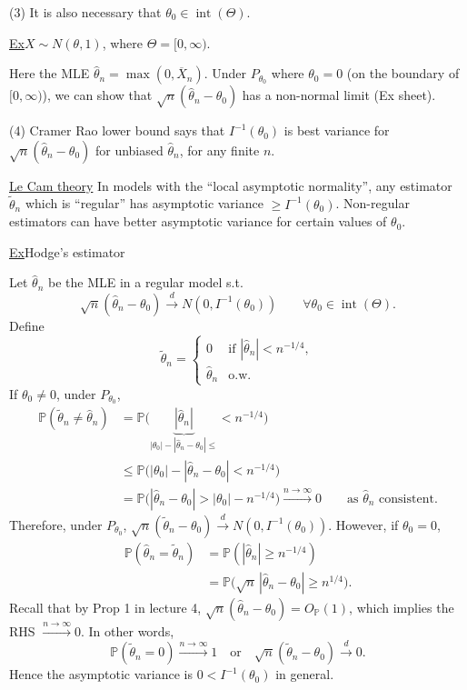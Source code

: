 \documentclass[11pt,a4paper]{article}
\begin{document}
\medskip
\noindent (3) It is also necessary that $\theta_0\in\operatorname{int}(\Theta)$.

\medskip
\noindent\underline{Ex}\quad $X\sim N(\theta,1)$, where $\Theta=[0,\infty)$.

Here the MLE $\hat{\theta}_n=\max(0,\overline{X}_n)$.
Under $P_{\theta_0}$ where $\theta_0=0$ (on the boundary of $[0,\infty)$),
we can show that $\sqrt{n}(\hat{\theta}_n-\theta_0)$ has a non-normal limit (Ex sheet).

\medskip
\noindent (4) Cramer Rao lower bound says that $I^{-1}(\theta_0)$ is
best variance for $\sqrt{n}(\hat{\theta}_n-\theta_0)$ for unbiased
$\hat{\theta}_n$, for any finite $n$.

\medskip
\noindent\underline{Le Cam theory}\quad
In models with the ``local asymptotic normality'', any estimator
$\tilde{\theta}_n$ which is ``regular'' has asymptotic variance
$\geq I^{-1}(\theta_0)$.
Non-regular estimators can have better asymptotic variance for certain values of $\theta_0$.

\medskip
\noindent\underline{Ex}\quad Hodge's estimator

Let $\hat{\theta}_n$ be the MLE in a regular model s.t.
\[
\sqrt{n}(\hat{\theta}_n-\theta_0)\xrightarrow{d}N(0,I^{-1}(\theta_0))
\qquad\forall\theta_0\in\operatorname{int}(\Theta).
\]
Define
\[
\tilde{\theta}_n=
\begin{cases}
0&\text{if }|\hat{\theta}_n|<n^{-1/4},\\
\hat{\theta}_n&\text{o.w.}
\end{cases}
\]
If $\theta_0\neq0$, under $P_{\theta_0}$,
\[
\begin{aligned}
\mathbb{P}(\tilde{\theta}_n\neq\hat{\theta}_n)
&=\mathbb{P}\bigl(\underbrace{|\hat{\theta}_n|}
_{|\theta_0|-|\hat{\theta}_n-\theta_0|\leq}<n^{-1/4}\bigr)\\
&\leq\mathbb{P}\bigl(|\theta_0|-|\hat{\theta}_n-\theta_0|<n^{-1/4}\bigr)\\
&=\mathbb{P}\bigl(|\hat{\theta}_n-\theta_0|>|\theta_0|-n^{-1/4}\bigr)
\xrightarrow{n\to\infty}0
\qquad\text{as }\hat{\theta}_n\text{ consistent}.
\end{aligned}
\]
Therefore, under $P_{\theta_0}$,
$\sqrt{n}(\tilde{\theta}_n-\theta_0)\xrightarrow{d}N(0,I^{-1}(\theta_0))$.
However, if $\theta_0=0$,
\[
\begin{aligned}
\mathbb{P}(\hat{\theta}_n=\tilde{\theta}_n)
&=\mathbb{P}(|\hat{\theta}_n|\geq n^{-1/4})\\
&=\mathbb{P}\bigl(\sqrt{n}\,|\hat{\theta}_n-\theta_0|\geq n^{1/4}\bigr).
\end{aligned}
\]
Recall that by Prop 1 in lecture 4,
$\sqrt{n}(\hat{\theta}_n-\theta_0)=O_{\mathbb{P}}(1)$, which implies
the RHS $\xrightarrow{n\to\infty}0$.
In other words,
\[
\mathbb{P}(\tilde{\theta}_n=0)\xrightarrow{n\to\infty}1
\quad\text{or}\quad
\sqrt{n}(\tilde{\theta}_n-\theta_0)\xrightarrow{d}0.
\]
Hence the asymptotic variance is $0<I^{-1}(\theta_0)$ in general.
\end{document}
